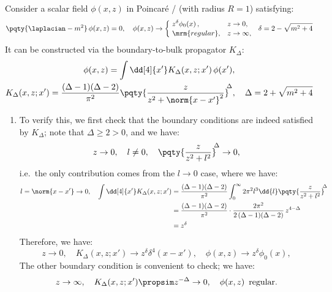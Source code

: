 \documentclass[a4paper,10pt]{article}
\begin{document}
\begin{enumerate}
	Consider a scalar field $\phi(x,z)$ in Poincar\'e \adsFive/ (with radius $R = 1$) satisfying:
	\begin{equation}
		\pqty{\laplacian - m^2}\,
			\phi(x,z) = 0,
	\quad
		\phi(x,z) \to
		\left\lbrace\vbox to 12.5pt {}\right.
		\begin{aligned}
			& z^\delta \phi_0(x)\,,
				&& z\to 0, \\[-.35ex]
			& \mrm{regular},
				&& z\to\infty,
		\end{aligned}
	\quad
		\delta = 2 - \sqrt{m^2 + 4}
	\end{equation}
	It can be constructed via the boundary-to-bulk propagator $K_\Delta$:
	\begin{gather}
		\phi(x,z)
		= \int \dd[4]{x'}
			K_\Delta(x,z;x')\,
			\phi(x'),
	\\
		K_\Delta(x,z;x')
		= \frac{(\Delta - 1)(\Delta - 2)}{\pi^2}
			\pqty{\frac{z}{
				z^2 + \norm{x - x'}^2
			}}^{\!\!\Delta},
	\quad
		\Delta = 2 + \sqrt{m^2 + 4}
	\end{gather}
	
	\begin{enumerate}
	\item To verify this, we first check that the boundary conditions are indeed satisfied by $K_\Delta$; note that $\Delta \ge 2 > 0$, and we have:
	\begin{equation}
		z\to 0,\quad l \ne 0,
	\quad
		\pqty{\frac{z}{
			z^2 + l^2
		}}^{\!\!\Delta} \to 0,
	\end{equation}
	i.e.\ the only contribution comes from the $l\to 0$ case, where we have:
	\begin{equation}
	\begin{aligned}
		l = \norm{x - x'} \to 0,
	\quad
		\int \dd[4]{x'}
			K_\Delta(x,z;x')
		&= \frac{(\Delta - 1)(\Delta - 2)}{\pi^2}
			\int_0^\infty 2\pi^2 l^3 \dd{l}
				\pqty{\frac{z}{
					z^2 + l^2
				}}^{\!\!\Delta} \\
		&= \frac{(\Delta - 1)(\Delta - 2)}{\pi^2}\cdot
			\frac{2\pi^2}{2\,(\Delta - 1)(\Delta - 2)}\,
			z^{4 - \Delta} \\
		&= z^\delta
	\end{aligned}
	\end{equation}
	Therefore, we have:
	\begin{equation}
		z \to 0,
	\quad
		K_\Delta(x,z;x')
		\to z^\delta \delta^4(x - x'),
	\quad
		\phi(x,z)
		\to z^\delta \phi_0(x),
	\end{equation}
	The other boundary condition is convenient to check; we have:
	\begin{equation}
		z \to \infty,
	\quad
		K_\Delta(x,z;x')
		\propsim z^{-\Delta} \to 0,
	\quad
		\phi(x,z)
		\,\ \text{regular.}
	\end{equation}
	

\end{enumerate}
\end{enumerate}
\end{document}
